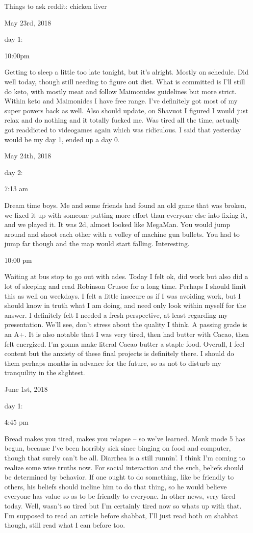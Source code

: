 Things to ask reddit: chicken liver

\bigskip
\bigskip
May 23rd, 2018

day 1:

10:00pm

Getting to sleep a little too late tonight, but it's alright. Mostly on
schedule. Did well today, though still needing to figure out diet. What
is committed is I'll still do keto, with mostly meat and follow
Maimonides guidelines but more strict. Within keto and Maimonides I have
free range. I've definitely got most of my super powers back as well.
Also should update, on Shavuot I figured I would just relax and do
nothing and it totally fucked me. Was tired all the time, actually got
readdicted to videogames again which was ridiculous. I said that
yesterday would be my day 1, ended up a day 0.

\bigskip
\bigskip
May 24th, 2018

day 2:

7:13 am

Dream time boys. Me and some friends had found an old game that was
broken, we fixed it up with someone putting more effort than everyone
else into fixing it, and we played it. It was 2d, almost looked like
MegaMan. You would jump around and shoot each other with a volley of
machine gun bullets. You had to jump far though and the map would start
falling. Interesting.

10:00 pm

Waiting at bus stop to go out with ades. Today I felt ok, did work but
also did a lot of sleeping and read Robinson Crusoe for a long time.
Perhaps I should limit this as well on weekdays. I felt a little
insecure as if I was avoiding work, but I should know in truth what I am
doing, and need only look within myself for the answer. I definitely
felt I needed a fresh perspective, at least regarding my presentation.
We'll see, don't stress about the quality I think. A passing grade is an
A+. It is also notable that I was very tired, then had butter with
Cacao, then felt energized. I'm gonna make literal Cacao butter a staple
food. Overall, I feel content but the anxiety of these final projects is
definitely there. I should do them perhaps months in advance for the
future, so as not to disturb my tranquility in the slightest.

\bigskip
\bigskip
June 1st, 2018

day 1:

4:45 pm

Bread makes you tired, makes you relapse -- so we've learned. Monk mode
5 has begun, because I've been horribly sick since binging on food and
computer, though that surely can't be all. Diarrhea is a still runnin'.
I think I'm coming to realize some wise truths now. For social
interaction and the such, beliefs should be determined by behavior. If
one ought to do something, like be friendly to others, his beliefs
should incline him to do that thing, so he would believe everyone has
value so as to be friendly to everyone. In other news, very tired today.
Well, wasn't so tired but I'm certainly tired now so whats up with that.
I'm supposed to read an article before shabbat, I'll just read both on
shabbat though, still read what I can before too.

